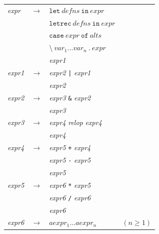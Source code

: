 \documentclass{jbook}
\begin{document}
\begin{center}
	\begin{tabular} {l c l l}
		\textit{expr}  & $\rightarrow$ & $\texttt{let} ~ defns ~ \texttt{in} ~ expr$                        &              \\
		               & \textbar      & $\texttt{letrec} ~ defns ~ \texttt{in} ~ expr$                     &              \\
		               & \textbar      & $\texttt{case} ~ expr ~ \texttt{of} ~ alts$                        &              \\
		               & \textbar      & $\texttt{\textbackslash} ~ var_1 \ldots var_n ~ \texttt{.} ~ expr$ &              \\
		               & \textbar      & \textit{expr1}                                                     &              \\
		\textit{expr1} & $\rightarrow$ & \textit{expr2} \texttt{|} \textit{expr1}                           &              \\
		               & \textbar      & \textit{expr2}                                                     &              \\
		\textit{expr2} & $\rightarrow$ & \textit{expr3} \texttt{\&} \textit{expr2}                          &              \\
		               & \textbar      & \textit{expr3}                                                     &              \\
		\textit{expr3} & $\rightarrow$ & \textit{expr4} \textit{relop} \textit{expr4}                       &              \\
		               & \textbar      & \textit{expr4}                                                     &              \\
		\textit{expr4} & $\rightarrow$ & \textit{expr5} \texttt{+} \textit{expr4}                           &              \\
		               & \textbar      & \textit{expr5} \texttt{-} \textit{expr5}                           &              \\
		               & \textbar      & \textit{expr5}                                                     &              \\
		\textit{expr5} & $\rightarrow$ & \textit{expr6} \texttt{*} \textit{expr5}                           &              \\
		               & \textbar      & \textit{expr6} \texttt{/} \textit{expr6}                           &              \\
		               & \textbar      & \textit{expr6}                                                     &              \\
		\textit{expr6} & $\rightarrow$ & $aexpr_1 \ldots aexpr_n$                                           & $(n \geq 1)$ \\
	\end{tabular}
\end{center}
\end{document}
